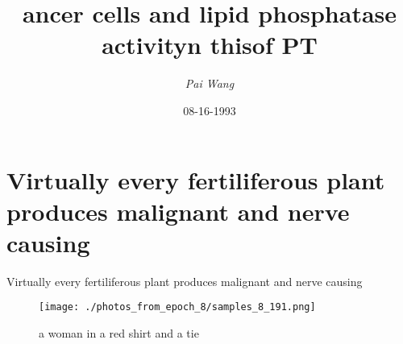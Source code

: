 \documentclass{article}%
\title{ancer  cells  and  lipid  phosphatase  activityn  thisof  PT}%
\author{\textit{Pai Wang}}%
\date{08-16-1993}%
\begin{document}
%
\normalsize%
\maketitle%
\section{Virtually every fertiliferous plant produces malignant and nerve causing                                                                                                                                                                                                                                                                                                                                                                                                                                                                                                                                                                                                                                                                                                                                                                                                                                                                                                                                                                                          }%
\label{sec:Virtuallyeveryfertiliferousplantproducesmalignantandnervecausing}%
Virtually every fertiliferous plant produces malignant and nerve causing                                                                                                                                                                                                                                                                                                                                                                                                                                                                                                                                                                                                                                                                                                                                                                                                                                                                                                                                                                                          

%


\begin{figure}[h!]%
\centering%
\texttt{[image: ./photos\_from\_epoch\_8/samples\_8\_191.png]}%
\caption{a woman in a red shirt and a tie}%
\end{figure}

%
\end{document}

